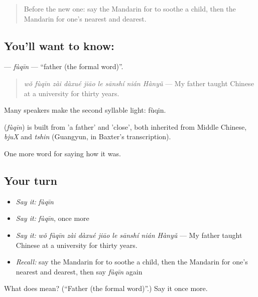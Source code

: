 \begin{quote}
Before the new one: say the Mandarin for to soothe a child, then the Mandarin for one's nearest and dearest.
\end{quote}

\subsection*{You'll want to know: }
\textbf{} — \emph{fùqīn} — \textquotedblleft{}father (the formal word)\textquotedblright{}.

\begin{quote}
\textbf{} \emph{wǒ fùqīn zài dàxué jiāo le sānshí nián Hànyǔ} — My father taught Chinese at a university for thirty years.
\end{quote}

Many speakers make the second syllable light: fùqin.

\begin{cousinweb}
\textbf{} (\emph{fùqīn}) is built from  'a father' and  'close', both inherited from Middle Chinese, \emph{bjuX} and \emph{tshin} (Guangyun, in Baxter's transcription).
\end{cousinweb}

\begin{grammarlens}[title={What you've built}]
One more word for saying how it was.
\end{grammarlens}

\subsection*{Your turn}
\begin{itemize}
\raggedright
  \item \emph{Say it:} \emph{fùqīn}
  \item \emph{Say it:} \emph{fùqīn}, once more
  \item \emph{Say it:} \emph{wǒ fùqīn zài dàxué jiāo le sānshí nián Hànyǔ} — My father taught Chinese at a university for thirty years.
  \item \emph{Recall:} say the Mandarin for to soothe a child, then the Mandarin for one's nearest and dearest, then say \emph{fùqīn} again
\end{itemize}

\begin{tcolorbox}[breakable,colback=teal!4,colframe=teal!35!black,title={Before you move on}]
What does  mean? (\textquotedblleft{}Father (the formal word)\textquotedblright{}.) Say it once more.
\end{tcolorbox}

